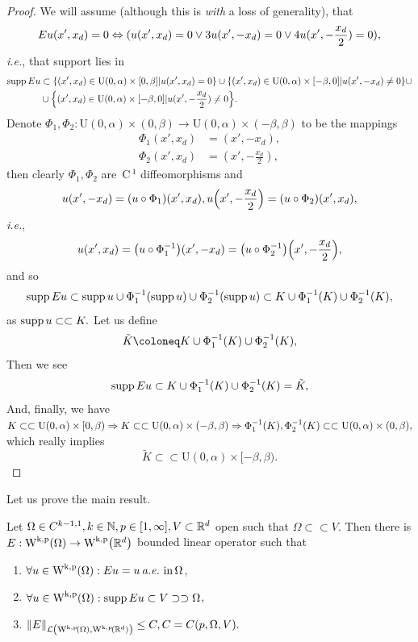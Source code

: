 \documentclass{article}
\begin{document}
\begin{proof}
	We will assume (although this is \textit{with} a loss of generality), that
	\[
		Eu\qty(x', x_d) = 0 \Leftrightarrow (u(x', x_d) = 0 \vee 3u(x',-x_d) = 0 \vee 4u(x', - \frac{x_d}{2})= 0),
	\]
	\textit{i.e.}, that support lies in
	\begin{align*}
		\operatorname{supp} Eu &\subset\qty{(x',x_d) \in \text{U}(0,\alpha) \times [0, \beta] | u(x', x_d) = 0} \cup \qty{(x',x_d) \in \text{U}(0,\alpha) \times [-\beta,0]| u(x', - x_d) \neq 0}\cup \\
			 &\cup \qty{(x',x_d) \in \text{U}(0,\alpha) \times [-\beta,0]| u(x', - \frac{x_d}{2}) \neq 0}.
	\end{align*}
	Denote $\Phi_1, \Phi_2: \text{U}(0,\alpha) \times (0,\beta) \to \text{U}(0,\alpha) \times (-\beta,\beta)$ to be the mappings
	\begin{align*}
		\Phi_1 (x',x_d) &= (x', -x_d),\\
		\Phi_2 (x',x_d) &= (x', - \frac{x_d}{2}),
	\end{align*}
	then clearly $\Phi_1, \Phi_2$ are $\, \text{C} \,^1$ diffeomorphisms and
	\[
		u(x',-x_d) = \qty(u \circ \Phi_1)(x',x_d), u\qty(x', - \frac{x_d}{2}) = \qty(u \circ \Phi_2)\qty(x',x_d),
	\]
	\textit{i.e.},
	\[
		u\qty(x',x_d) = \qty(u \circ \Phi_1^{-1})\qty(x', -x_d) = \qty(u \circ \Phi_2^{-1})\qty(x',-\frac{x_d}{2}),
	\]
	and so
	\[
		\operatorname{supp} Eu \subset \operatorname{supp} u \cup \Phi_1^{-1}\qty(\operatorname{supp} u) \cup \Phi_2^{-1}\qty(\operatorname{supp} u) \subset K \cup \Phi_1^{-1}\qty(K) \cup \Phi_2^{-1}\qty(K),
	\]
	as $\operatorname{supp} u \subset \subset K.$ Let us define
	\[
		\tilde{K} \coloneq K \cup \Phi_1^{-1}\qty(K) \cup \Phi_2^{-1}\qty(K),
	\]
	Then we see
	\[
		\operatorname{supp} Eu \subset K \cup \Phi_1^{-1}\qty(K) \cup \Phi_2^{-1}\qty(K) = \tilde{K},
	\]
	And, finally, we have $K \subset \subset \text{U}(0,\alpha) \times [0,\beta) \Rightarrow K \subset \subset \text{U}(0,\alpha) \times (-\beta,\beta) \Rightarrow \Phi_1^{-1}\qty(K), \Phi_2^{-1}\qty(K)\subset \subset \text{U}(0,\alpha)\times (0,\beta),$ which really implies
	\[
		\tilde{K} \subset \subset \text{U}(0,\alpha) \times [-\beta, \beta).
	\]
\end{proof}

Let us prove the main result.

\begin{theorem}
	Let $\Omega \in C^{k-1,1}, k \in {\mathbb N}, p \in [1,\infty], V \subset {\mathbb R}^d$ open such that $\Omega \subset \subset V.$ Then there is $E: \WkpSet{\Omega} \to \WkpSet{\R^d}$ bounded linear operator such that
	\begin{enumerate}
		\item $ \forall u \in \WkpSet{\Omega}: Eu=u \, \text{\textit{a.e.}} \,\, \text{in} \, \Omega$,
		\item $ \forall u \in \WkpSet{\Omega}: \supp Eu \subset V \supset \supset \Omega$,
		\item $\norm{E}_{\mathcal{L}\qty(\WkpSet{\Omega},\WkpSet{\R^{d}})} \leq C, C=C(p,\Omega,V).$
	\end{enumerate}
\end{theorem}
\end{document}
